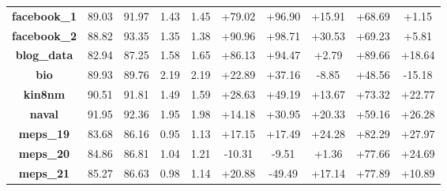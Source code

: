 \documentclass{article}
\begin{document}
\begin{appendices}
\begin{table}[htbp]
{\begin{tabular}{cccccccccc}
    \midrule


\textbf{facebook\_1} & 89.03  & 91.97  & 1.43  & 1.45  & \textcolor[rgb]{ 0,  .502,  0}{+79.02} & \textcolor[rgb]{ 0,  .502,  0}{+96.90} & \textcolor[rgb]{ 0,  .502,  0}{+15.91} & \textcolor[rgb]{ 0,  .502,  0}{+68.69} & \textcolor[rgb]{ 0,  .502,  0}{+1.15} \\
    \textbf{facebook\_2} & 88.82  & 93.35  & 1.35  & 1.38  & \textcolor[rgb]{ 0,  .502,  0}{+90.96} & \textcolor[rgb]{ 0,  .502,  0}{+98.71} & \textcolor[rgb]{ 0,  .502,  0}{+30.53} & \textcolor[rgb]{ 0,  .502,  0}{+69.23} & \textcolor[rgb]{ 0,  .502,  0}{+5.81} \\
    \textbf{blog\_data} & 82.94  & 87.25  & 1.58  & 1.65  & \textcolor[rgb]{ 0,  .502,  0}{+86.13} & \textcolor[rgb]{ 0,  .502,  0}{+94.47} & \textcolor[rgb]{ 0,  .502,  0}{+2.79} & \textcolor[rgb]{ 0,  .502,  0}{+89.66} & \textcolor[rgb]{ 0,  .502,  0}{+18.64} \\
    \textbf{bio} & 89.93  & 89.76  & 2.19  & 2.19  & \textcolor[rgb]{ 0,  .502,  0}{+22.89} & \textcolor[rgb]{ 0,  .502,  0}{+37.16} & \textcolor[rgb]{ 1,  0,  0}{-8.85} & \textcolor[rgb]{ 0,  .502,  0}{+48.56} & \textcolor[rgb]{ 1,  0,  0}{-15.18} \\
    \textbf{kin8nm} & 90.51  & 91.81  & 1.49  & 1.59  & \textcolor[rgb]{ 0,  .502,  0}{+28.63} & \textcolor[rgb]{ 0,  .502,  0}{+49.19} & \textcolor[rgb]{ 0,  .502,  0}{+13.67} & \textcolor[rgb]{ 0,  .502,  0}{+73.32} & \textcolor[rgb]{ 0,  .502,  0}{+22.77} \\
    \textbf{naval} & 91.95  & 92.36  & 1.95  & 1.98  & \textcolor[rgb]{ 0,  .502,  0}{+14.18} & \textcolor[rgb]{ 0,  .502,  0}{+30.95} & \textcolor[rgb]{ 0,  .502,  0}{+20.33} & \textcolor[rgb]{ 0,  .502,  0}{+59.16} & \textcolor[rgb]{ 0,  .502,  0}{+26.28} \\
    \textbf{meps\_19} & 83.68  & 86.16  & 0.95  & 1.13  & \textcolor[rgb]{ 0,  .502,  0}{+17.15} & \textcolor[rgb]{ 0,  .502,  0}{+17.49} & \textcolor[rgb]{ 0,  .502,  0}{+24.28} & \textcolor[rgb]{ 0,  .502,  0}{+82.29} & \textcolor[rgb]{ 0,  .502,  0}{+27.97} \\
    \textbf{meps\_20} & 84.86  & 86.81  & 1.04  & 1.21  & \textcolor[rgb]{ 1,  0,  0}{-10.31} & \textcolor[rgb]{ 1,  0,  0}{-9.51} & \textcolor[rgb]{ 0,  .502,  0}{+1.36} & \textcolor[rgb]{ 0,  .502,  0}{+77.66} & \textcolor[rgb]{ 0,  .502,  0}{+24.69} \\
    \textbf{meps\_21} & 85.27  & 86.63  & 0.98  & 1.14  & \textcolor[rgb]{ 0,  .502,  0}{+20.88} & \textcolor[rgb]{ 1,  0,  0}{-49.49} & \textcolor[rgb]{ 0,  .502,  0}{+17.14} & \textcolor[rgb]{ 0,  .502,  0}{+77.89} & \textcolor[rgb]{ 0,  .502,  0}{+10.89} \\
    

\end{tabular}}
\end{table}
\end{appendices}
\end{document}
